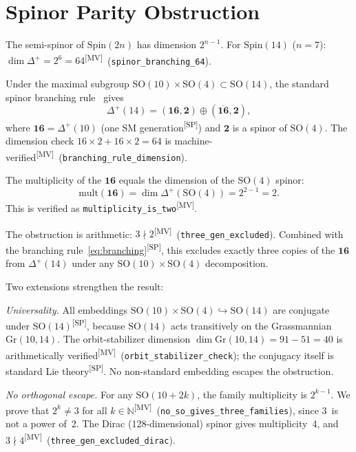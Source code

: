 \documentclass[aps,prl,twocolumn,showpacs,preprintnumbers,superscriptaddress,floatfix]{revtex4-2}
\newcommand{\MV}{\textsuperscript{[MV]}}
\newcommand{\SP}{\textsuperscript{[SP]}}
\begin{document}
\section{Spinor Parity Obstruction}
\label{sec:obstruction}

The semi-spinor of $\mathrm{Spin}(2n)$ has dimension $2^{n-1}$.
For $\mathrm{Spin}(14)$ ($n = 7$): $\dim \Delta^+ = 2^6 = 64$\MV\
(\texttt{spinor\_branching\_64}).

Under the maximal subgroup $\mathrm{SO}(10) \times \mathrm{SO}(4)
\subset \mathrm{SO}(14)$, the standard spinor branching
rule~\cite{slansky1981} gives
\begin{equation}
  \Delta^+(14) = (\mathbf{16}, \mathbf{2})
  \oplus (\overline{\mathbf{16}}, \mathbf{2}),
  \label{eq:branching}
\end{equation}
where $\mathbf{16} = \Delta^+(10)$ (one SM generation\SP) and
$\mathbf{2}$ is a spinor of $\mathrm{SO}(4)$.  The dimension
check $16 \times 2 + 16 \times 2 = 64$ is machine-verified\MV\
(\texttt{branching\_rule\_dimension}).

The multiplicity of the $\mathbf{16}$ equals the dimension of
the $\mathrm{SO}(4)$ spinor:
\begin{equation}
  \mathrm{mult}(\mathbf{16}) = \dim \Delta^+(\mathrm{SO}(4))
  = 2^{2-1} = 2.
  \label{eq:mult}
\end{equation}
This is verified as \texttt{multiplicity\_is\_two}\MV.

The obstruction is arithmetic: $3 \nmid 2$\MV\
(\texttt{three\_gen\_excluded}).  Combined with the branching
rule~\eqref{eq:branching}\SP, this excludes exactly three copies
of the $\mathbf{16}$ from $\Delta^+(14)$ under any
$\mathrm{SO}(10) \times \mathrm{SO}(4)$ decomposition.

Two extensions strengthen the result:

\emph{Universality.}  All embeddings $\mathrm{SO}(10) \times
\mathrm{SO}(4) \hookrightarrow \mathrm{SO}(14)$ are conjugate
under $\mathrm{SO}(14)$\SP, because $\mathrm{SO}(14)$ acts
transitively on the Grassmannian $\mathrm{Gr}(10,14)$.
The orbit-stabilizer dimension $\dim \mathrm{Gr}(10,14) =
91 - 51 = 40$ is arithmetically verified\MV\
(\texttt{orbit\_stabilizer\_check}); the conjugacy itself is
standard Lie theory\SP.
No non-standard embedding escapes the obstruction.

\emph{No orthogonal escape.}  For any $\mathrm{SO}(10{+}2k)$,
the family multiplicity is $2^{k-1}$.  We prove that $2^k \neq 3$
for all $k \in \mathbb{N}$\MV\ (\texttt{no\_so\_gives\_three\_families}),
since 3~is not a power of~2.  The Dirac (128-dimensional) spinor
gives multiplicity~4, and $3 \nmid 4$\MV\
(\texttt{three\_gen\_excluded\_dirac}).
\end{document}
